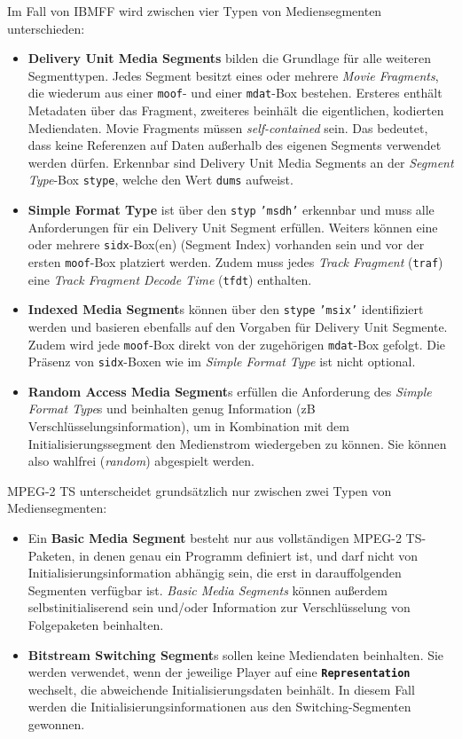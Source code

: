 \documentclass[paper = a4, fontsize = 12pt, parskip = half]{scrartcl} %
\def\attr#1{\texttt{#1}}
\def\elem#1{\texttt{\textbf{#1}}}
\begin{document}
Im Fall von IBMFF wird zwischen vier Typen von Mediensegmenten unterschieden:

\begin{itemize}
	\item \textbf{Delivery Unit Media Segments} bilden die Grundlage für alle weiteren Segmenttypen. Jedes Segment besitzt eines oder mehrere \textit{Movie Fragments}, die wiederum aus einer \attr{moof}- und einer \attr{mdat}-Box bestehen. Ersteres enthält Metadaten über das Fragment, zweiteres beinhält die eigentlichen, kodierten Mediendaten. Movie Fragments müssen \textit{self-contained} sein. Das bedeutet, dass keine Referenzen auf Daten außerhalb des eigenen Segments verwendet werden dürfen. Erkennbar sind Delivery Unit Media Segments an der \textit{Segment Type}-Box \attr{stype}, welche den Wert \attr{dums} aufweist.
	\item \textbf{Simple Format Type} ist über den \attr{styp} \attr{'msdh'} erkennbar und muss alle Anforderungen für ein Delivery Unit Segment erfüllen. Weiters können eine oder mehrere \attr{sidx}-Box(en) (Segment Index) vorhanden sein und vor der ersten \attr{moof}-Box platziert werden. Zudem muss jedes \textit{Track Fragment} (\attr{traf}) eine \textit{Track Fragment Decode Time} (\attr{tfdt}) enthalten.
	\item \textbf{Indexed Media Segment}s können über den \attr{stype} \attr{'msix'} identifiziert werden und basieren ebenfalls auf den Vorgaben für Delivery Unit Segmente. Zudem wird jede \attr{moof}-Box direkt von der zugehörigen \attr{mdat}-Box gefolgt. Die Präsenz von \attr{sidx}-Boxen wie im \textit{Simple Format Type} ist nicht optional.
	\item \textbf{Random Access Media Segment}s erfüllen die Anforderung des \textit{Simple Format Type}s und beinhalten genug Information (zB Verschlüsselungsinformation), um in Kombination mit dem Initialisierungssegment den Medienstrom wiedergeben zu können. Sie können also wahlfrei (\textit{random}) abgespielt werden.
\end{itemize}

MPEG-2 TS unterscheidet grundsätzlich nur zwischen zwei Typen von Mediensegmenten:
\begin{itemize}
	\item Ein \textbf{Basic Media Segment} besteht nur aus vollständigen MPEG-2 TS-Paketen, in denen genau ein Programm definiert ist, und darf nicht von Initialisierungsinformation abhängig sein, die erst in darauffolgenden Segmenten verfügbar ist. \textit{Basic Media Segments} können außerdem selbstinitialiserend sein und/oder Information zur Verschlüsselung von Folgepaketen beinhalten.
	\item \textbf{Bitstream Switching Segment}s sollen keine Mediendaten beinhalten. Sie werden verwendet, wenn der jeweilige Player auf eine \elem{Representation} wechselt, die abweichende Initialisierungsdaten beinhält. In diesem Fall werden die Initialisierungsinformationen aus den Switching-Segmenten gewonnen.
\end{itemize}
\end{document}
